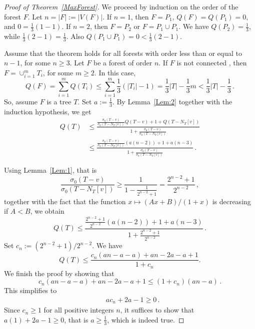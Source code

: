 \documentclass[a4paper,12pt]{amsart}
\begin{document}
	\begin{proof} [Proof of Theorem~\ref{MaxForest}]
		We proceed by induction on the order of the forest $F$. Let $n=|F|:=|V(F)|$. If $n=1$, then $F=P_1$, $Q(F)=Q(P_1)=0$, and $0= \frac{1}{3}(1-1)$. If $n=2$, then $F=P_2$ or $F=P_1\cup P_1$. We have
			$Q(P_2)=\frac{1}{3}$, while $\frac{1}{3}\left(2-1\right)=\frac{1}{3}$. Also
			$Q(P_1\cup P_1)=0<\frac{1}{3}\left(2-1\right)$.
            
			Assume that the theorem holds for all forests with order less than or equal to $n-1$, for some $n\geq 3$. Let $F$ be a forest of order $n$. If $F$ is not connected , then $F=\cup_{i=1}^mT_i$, for some $m\geq 2$. In this case,
			\begin{equation*}
			Q(F)=\sum_{i=1}^{m}Q(T_i)\leq \sum_{i=1}^{m}\frac{1}{3}\left(|T_i|-1\right)
					=\frac{1}{3}|T|-\frac{1}{3}m < \frac{1}{3}|T|-\frac{1}{3}\,.
			\end{equation*}
			So, assume $F$ is a tree $T$. 
    Set $a:=\frac{1}{3}$. By Lemma~\ref{Lem:2} together with the induction hypothesis, we get
		\begin{equation*}
	\begin{aligned}
			Q(T)&\leq \frac{\displaystyle\frac{\sigma_0\left(T-v\right)}{\sigma_0\left(T-N_T[v]\right)}Q(T-v)+1+Q\left(T-N_T[v]\right)}{1+\displaystyle\frac{\sigma_0\left(T-v\right)}{\sigma_0\left(T-N_T[v]\right)}}\\
			&\leq \frac{\displaystyle\frac{\sigma_0\left(T-v\right)}{\sigma_0\left(T-N_T[v]\right)}(a(n-2))+1+a(n-3)}{1+\displaystyle\frac{\sigma_0\left(T-v\right)}{\sigma_0\left(T-N_T[v]\right)}}\,.
	\end{aligned}
	\end{equation*}
    
	Using Lemma~\ref{Lem:1}, that is $$\frac{\sigma_0\left(T-v\right)}{\sigma_0\left(T-N_T[v]\right)}\geq \frac{1}{\displaystyle 1-\frac{1}{2^{n-2}+1}}=\frac{2^{n-2}+1}{2^{n-2}}\,,$$ 
    together with the fact that the function $x \mapsto (Ax+B)/(1+x)$ is decreasing  if $A< B$, we obtain
	\begin{equation*}
		Q(T)\leq \frac{\displaystyle\frac{2^{n-2}+1}{2^{n-2}}\left(a(n-2)\right)+ 1+a(n-3)}{1+\displaystyle \frac{2^{n-2}+1}{2^{n-2}}}\,.
	\end{equation*}
	Set $c_n:=(2^{n-2}+1) / 2^{n-2}$. We have
	\begin{equation*}
		Q(T)\leq \frac{c_n\left(an-a-a\right)+an-2a-a+1}{1+c_n}.
	\end{equation*}
  We finish the proof by showing that  
$$c_n\left(an-a-a\right)+an-2a-a+1\leq \left(1+c_n\right)\left(an-a\right)\,.$$
This simplifies to 
	\begin{equation*}
		\begin{aligned}
			& ac_n+2a-1\geq 0\,.
		\end{aligned}
	\end{equation*}
	Since $c_n\geq 1$ for all positive integers $n$, it suffices to show that $a(1)+2a-1 \geq 0$, that is $a\geq \frac{1}{3}$,
	which is indeed true.
	\end{proof}
\end{document}
